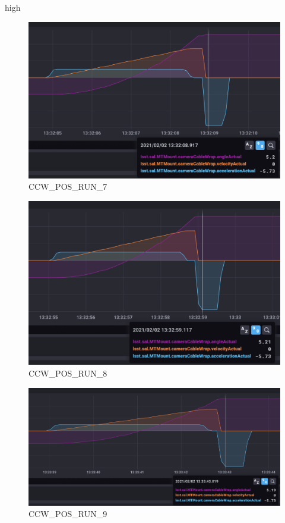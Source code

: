 high\documentclass[SE,lsstdraft,authoryear,toc]{lsstdoc}
\begin{document}
\begin{figure}[h!]
  \includegraphics[width=\linewidth]{media/CCW_design_speed_pos_test7.png}
  \caption{CCW\_POS\_RUN\_7}
  \label{fig:CCW_POS_RUN_7}
\end{figure}
\begin{figure}[h!]
  \includegraphics[width=\linewidth]{media/CCW_design_speed_pos_test8.png}
  \caption{CCW\_POS\_RUN\_8}
  \label{fig:CCW_POS_RUN_8}
\end{figure}
\begin{figure}[h!]
  \includegraphics[width=\linewidth]{media/CCW_design_speed_pos_test9.png}
  \caption{CCW\_POS\_RUN\_9}
  \label{fig:CCW_POS_RUN_9}
\end{figure}
\end{document}
